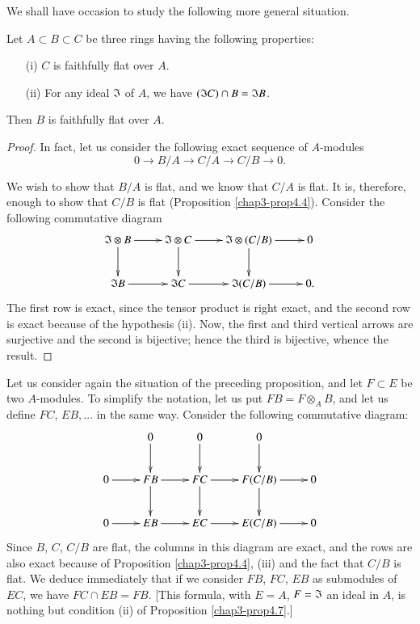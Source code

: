 We shall have occasion to study the following more general situation.

\begin{proposition}\label{chap3-prop4.7}
Let $A\subset B\subset C$ be three rings having the following properties:
\begin{itemize}
\item[\rm(i)] $C$ is faithfully flat over $A$.

\item[\rm(ii)] For any ideal $\mathfrak{I}$ of $A$, we have $(\mathfrak{I} C)\cap B=\mathfrak{I} B$.
\end{itemize}
Then $B$ is faithfully flat over $A$.
\end{proposition}

\begin{proof}
In fact, let us consider the following exact sequence of $A$-modules
$$
0\to B/A\to C/A\to C/B\to 0.
$$

We wish to show that $B/A$ is flat, and we know that $C/A$ is flat. It is, therefore, enough to show that $C/B$ is flat (Proposition \ref{chap3-prop4.4}). Consider the following commutative diagram
\[
\xymatrix{
\frakI\otimes B\ar[d]\ar[r] & \frakI\otimes C\ar[d]\ar[r] & \frakI\otimes (C/B)\ar[d]\ar[r] & 0\\
\frakI B\ar[r] & \frakI C\ar[r] & \frakI (C/B)\ar[r] & 0.
}
\]
The first row is exact, since the tensor product is right exact, and the second row is exact because of the hypothesis (ii). Now, the first and third vertical arrows are surjective and the second is bijective; hence the third is bijective, whence the result.
\end{proof}

\begin{remark}\label{chap3-rem4.8}
Let us consider again the situation of the preceding proposition, and let $F\subset E$ be two $A$-modules. To simplify the notation, let us put $FB=F\otimes_{A}B$, and let us define $FC$, $EB,\ldots$ in the same way. Consider the following commutative diagram:
\[
\xymatrix{
 & 0\ar[d] & 0\ar[d] & 0\ar[d] & \\
0\ar[r] & FB\ar[d]\ar[r] & FC\ar[d]\ar[r] & F(C/B)\ar[d]\ar[r] & 0\\
0\ar[r] & EB\ar[r] & EC\ar[r] & E(C/B)\ar[r] & 0
}
\]
Since $B$, $C$, $C/B$ are flat, the columns in this diagram are exact, and the rows are also exact because of Proposition \ref{chap3-prop4.4}, (iii) and the fact that $C/B$ is flat. We deduce immediately that if we consider $FB$, $FC$, $EB$ as submodules of $EC$, we have $FC\cap EB=FB$. [This formula, with $E=A$, $F=\mathfrak{I}$ an ideal in $A$, is nothing but condition (ii) of Proposition \ref{chap3-prop4.7}.]
\end{remark}

